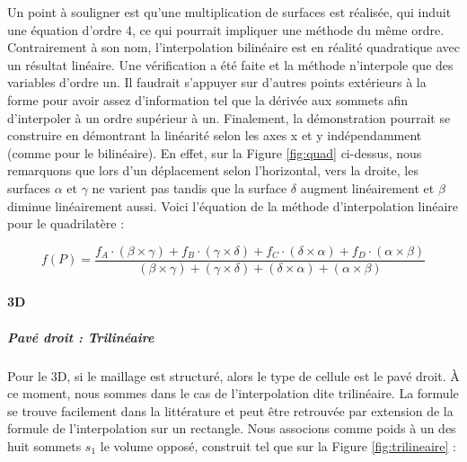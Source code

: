 Un point à souligner est qu'une multiplication de surfaces est réalisée, qui induit une équation d'ordre 4, ce qui pourrait impliquer une méthode du même ordre.
Contrairement à son nom, l'interpolation bilinéaire est en réalité quadratique avec un résultat linéaire.
Une vérification a été faite et la méthode n'interpole que des variables d'ordre un.
Il faudrait s'appuyer sur d'autres points extérieurs à la forme pour avoir assez d'information tel que la dérivée aux sommets afin d'interpoler à un ordre supérieur à un.
Finalement, la démonstration pourrait se construire en démontrant la linéarité selon les axes x et y indépendamment (comme pour le bilinéaire). En effet, sur la Figure \ref{fig:quad} ci-dessus, nous remarquons que lors d'un déplacement selon l'horizontal, vers la droite, les surfaces \(\alpha\) et \(\gamma\) ne varient pas tandis que la surface \(\delta\) augment linéairement et \(\beta\) diminue linéairement aussi.
Voici l'équation de la méthode d'interpolation linéaire pour le quadrilatère :

\begin{equation}
    f(P) = \frac{f_{A} \cdot (\beta \times \gamma) + f_{B} \cdot (\gamma \times \delta) + f_{C} \cdot (\delta \times \alpha) + f_{D} \cdot (\alpha \times \beta)}{(\beta \times \gamma) + (\gamma \times \delta) + (\delta \times \alpha) + (\alpha \times \beta)}
\end{equation}
    

\vspace{0.2cm}  %


\paragraph{3D}
\subparagraph{Pavé droit : Trilinéaire}

Pour le 3D, si le maillage est structuré, alors le type de cellule est le pavé droit. À ce moment, nous sommes dans le cas de l'interpolation dite trilinéaire. La formule se trouve facilement dans la littérature et peut être retrouvée par extension de la formule de l'interpolation sur un rectangle. Nous associons comme poids à un des huit sommets \( s_1 \) le volume opposé, construit tel que sur la Figure \ref{fig:trilineaire} :


